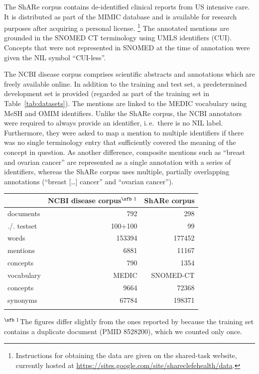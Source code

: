 \documentclass{bioinfo}
\newcommand{\url}[1]{\href{#1}{#1}}
\newcommand{\ie}{i.\,e.\ }
\begin{document}
The ShARe corpus contains de-identified clinical reports from US intensive care.
It is distributed as part of the MIMIC database  %
and is available for research purposes after acquiring a personal license.%
\footnote{Instructions for obtaining the data are given on the shared-task website, currently hosted at \url{https://sites.google.com/site/shareclefehealth/data}.}
The annotated mentions are grounded in the SNOMED CT terminology  %
using UMLS  %
identifiers (CUI).
Concepts that were not represented in SNOMED at the time of annotation were given the NIL symbol “CUI-less”.

The NCBI disease corpus comprises scientific abstracts and annotations which are freely available online.
In addition to the training and test set, a predetermined development set is provided (regarded as part of the training set in Table~\ref{tab:datasets}).
The mentions are linked to the MEDIC vocabulary  %
using MeSH  %
and OMIM  %
identifiers.
Unlike the ShARe corpus, the NCBI annotators were required to always provide an identifier, \ie there is no NIL label.
Furthermore, they were asked to map a mention to multiple identifiers if there was no single terminology entry that sufficiently covered the meaning of the concept in question.
As another difference, composite mentions such as “breast and ovarian cancer” are represented as a single annotation with a series of identifiers, whereas the ShARe corpus uses multiple, partially overlapping annotations (“breast [\dots] cancer” and “ovarian cancer”).

\begin{table}[!t]
{\begin{tabular}{@{}lrr@{}}\toprule
              & NCBI disease corpus$^\text{\sfb 1}$ & ShARe corpus\\\midrule
  documents   & 792     & 298\\
  ./. testset & 100+100 & 99\\
  words       & 153394  & 177452\\
  mentions    & 6881    & 11167\\
  concepts    & 790     & 1354\\
  \midrule
  vocabulary  & MEDIC   & SNOMED-CT\\
  concepts    & 9664    & 72368\\
  synonyms    & 67784   & 198371\\
  \botrule
\end{tabular}}{$^\text{\sfb 1}$The figures differ slightly from the ones reported by \cite{islamaj-dogan-et-al:2014} because the training set contains a duplicate document (PMID 8528200), which we counted only once.}
\end{table}
\end{document}
